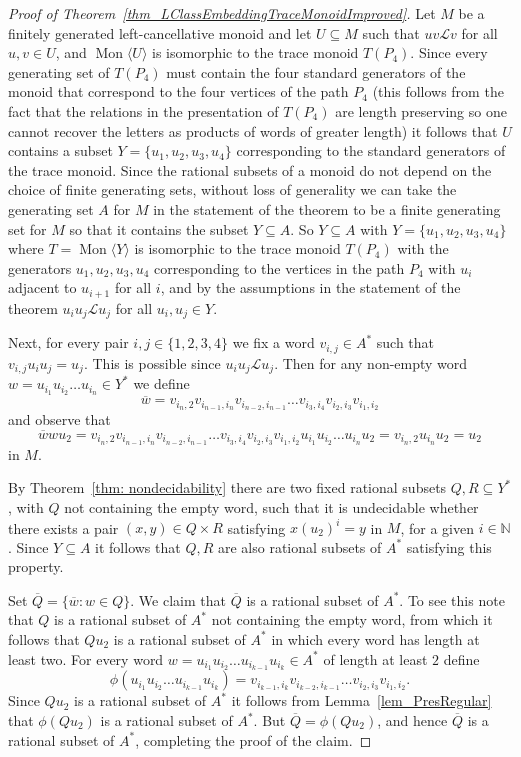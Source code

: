 \documentclass{amsart}
\newcommand{\Mgen}[1]{\operatorname{Mon}\bigl\langle #1 \bigr\rangle}
\newcommand{\gl}{\mathcal{L}}
\newcommand{\N}{\mathbb{N}}
\theoremstyle{plain}
\theoremstyle{definition}
\begin{document}
\begin{proof}[Proof of Theorem~\ref{thm_LClassEmbeddingTraceMonoidImproved}] 
Let $M$ be a finitely generated left-cancellative monoid and let $U \subseteq M$ such that $u v \gl v$ for all $u, v \in U$, and $\Mgen{U}$ is isomorphic to the trace monoid $T(P_4)$.
Since every generating set of $T(P_4)$ must contain the four standard generators of the monoid that correspond to the four vertices of the path $P_4$ (this follows from the fact that the relations in the presentation of $T(P_4)$ are length preserving so one cannot recover the letters as products of words of greater length) it follows that $U$ contains a subset $Y = \{u_1, u_2, u_3, u_4\}$ corresponding to the standard generators of the trace monoid. 
Since the rational subsets of a monoid do not depend on the choice of finite generating sets, without loss of generality we can take the generating set $A$ for $M$ in the statement of the theorem to be a finite generating set for $M$ 
so that it contains the subset $Y \subseteq A$. 
So $Y \subseteq A$ with $Y = \{u_1, u_2, u_3, u_4\}$ where $T = \Mgen{Y}$ is isomorphic to the trace monoid $T(P_4)$ with the generators $u_1, u_2, u_3, u_4$ corresponding to the vertices in the path $P_4$ with $u_i$ adjacent to $u_{i+1}$ for all $i$, and by the assumptions in the statement of the theorem $u_i u_j \gl u_j$ for all $u_i, u_j \in Y$. 

Next, for every pair $i, j \in \{1,2,3,4\}$ we fix a word $v_{i,j} \in A^*$ such that $v_{i,j}u_iu_j = u_j$.
This is possible since $u_iu_j \gl u_j$. 
Then for any non-empty word $w = u_{i_1}u_{i_2} \ldots u_{i_n} \in Y^*$ we define 
\[
\overline{w} = v_{i_n,2} v_{i_{n-1},i_{n}} v_{i_{n-2},i_{n-1}} \ldots v_{i_3,i_4} v_{i_2,i_3} v_{i_1,i_2} 
\]
and observe that 
\[
\overline{w} w u_2 =
v_{i_n,2} v_{i_{n-1},i_{n}} v_{i_{n-2},i_{n-1}} \ldots v_{i_3,i_4} v_{i_2,i_3} v_{i_1,i_2}
u_{i_1} u_{i_2} \ldots u_{i_n}
u_2 
= v_{i_n,2} u_{i_n} u_2 
= u_2
\]
in $M$. 
 
By Theorem~\ref{thm: nondecidability} 
there are two fixed rational subsets $Q, R \subseteq Y^*$, with $Q$ not containing the empty word, such that it is undecidable whether there exists a pair $(x,y) \in Q \times R$ satisfying $x(u_2)^i = y$ in $M$, for a given $i \in \N$.
Since $Y \subseteq A$ it follows that $Q, R$ are also rational subsets of $A^*$ satisfying this property.  

Set 
$\overline{Q} = \{ \overline{w} : w \in Q \}$. 
We claim that $\overline{Q}$ is a rational subset of $A^*$. 
To see this note that
$Q$ is a rational subset of $A^*$ not containing the empty word, from which it follows that 
$Qu_2$ is a rational subset of $A^*$ in which every word has length at least two. 
For every word $w = u_{i_1} u_{i_2} \ldots u_{i_{k-1}} u_{i_k}\in A^*$ of length at least $2$ define  
\[
\phi(u_{i_1} u_{i_2} \ldots u_{i_{k-1}} u_{i_k}) = 
v_{i_{k-1},i_k} 
v_{i_{k-2},i_{k-1}} 
\ldots 
v_{i_2,i_3} 
v_{i_1,i_2}.  
\]
Since $Qu_2$ is a rational subset of $A^*$ it follows from Lemma~\ref{lem_PresRegular} that $\phi(Qu_2)$ is a rational subset of $A^*$. 
But $\overline{Q} = \phi(Qu_2)$, and hence $\overline{Q}$ is a rational subset of $A^*$, completing the proof of the claim.


\end{proof}
\end{document}
